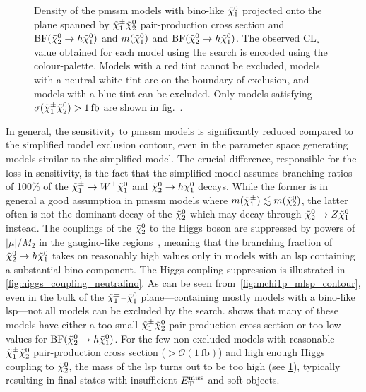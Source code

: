 \begin{figure}
\begin{subfigure}[b]{0.5\linewidth}
		\caption{\label{fig:fig_scatter_mchi10_BFHiggs_bino_withXsecCut}}
	\end{subfigure}\hfill
	\caption{Density of the \gls{pmssm} models with bino-like $\tilde{\chi}_1^0$ projected onto the plane spanned by  $\tilde{\chi}_1^\pm\tilde{\chi}_2^0$ pair-production cross section and $\mathrm{BF}(\tilde{\chi}_2^0 \rightarrow h \tilde{\chi}_1^0)$ and  $m(\tilde{\chi}_1^0)$ and $\mathrm{BF}(\tilde{\chi}_2^0 \rightarrow h \tilde{\chi}_1^0)$. The observed CL$_s$ value obtained for each model using the \onelepton search is encoded using the colour-palette. Models with a red tint cannot be excluded, models with a neutral white tint are on the boundary of exclusion, and models with a blue tint can be excluded. Only models satisfying $\sigma(\charg\neutr)>\SI{1}{\femto\barn}$ are shown in fig.~.}
	\label{fig:bino_sensitivity}
\end{figure}

In general, the sensitivity to \gls{pmssm} models is significantly reduced compared to the simplified model exclusion contour, even in the parameter space generating models similar to the simplified model. The crucial difference, responsible for the loss in sensitivity, is the fact that the simplified model assumes branching ratios of 100\% of the $\tilde{\chi}_1^\pm \rightarrow W^\pm \tilde{\chi}_1^0$ and $\tilde{\chi}_2^0 \rightarrow h \tilde{\chi}_1^0$ decays. While the former is in general a good assumption in \gls{pmssm} models where $m(\tilde{\chi}_1^\pm)\lesssim m(\tilde{\chi}_2^0)$, the latter often is not the dominant decay of the $\tilde{\chi}_2^0$ which may decay through $\tilde{\chi}_2^0 \rightarrow Z \tilde{\chi}_1^0$ instead. The couplings of the $\tilde{\chi}_2^0$ to the Higgs boson are suppressed by powers of $\vert\mu\vert/M_2$ in the gaugino-like regions~\cite{Arbey:2012fa}, meaning that the branching fraction of $\tilde{\chi}_2^0 \rightarrow h \tilde{\chi}_1^0$ takes on reasonably high values only in models with an \gls{lsp} containing a substantial bino component. The Higgs coupling suppression is illustrated in \cref{fig:higgs_coupling_neutralino}. As can be seen from~\cref{fig:mchi1p_mlsp_contour}, even in the bulk of the $\tilde{\chi}_1^\pm$--$\tilde{\chi}_1^0$ plane---containing mostly models with a bino-like \gls{lsp}---not all models can be excluded by the \onelepton search.  shows that many of these models have either a too small $\tilde{\chi}_1^\pm\tilde{\chi}_2^0$ pair-production cross section or too low values for $\mathrm{BF}(\tilde{\chi}_2^0 \rightarrow h \tilde{\chi}_1^0)$. For the few non-excluded models with reasonable $\tilde{\chi}_1^\pm\tilde{\chi}_2^0$ pair-production cross section ($> \mathcal{O}(\SI{1}{\femto\barn})$) and high enough Higgs coupling to $\tilde{\chi}_2^0$, the mass of the \gls{lsp} turns out to be too high (see \cref{fig:fig_scatter_mchi10_BFHiggs_bino_withXsecCut}), typically resulting in final states with insufficient $E_{\textrm{T}}^{\textrm{miss}}$ and soft objects.  

